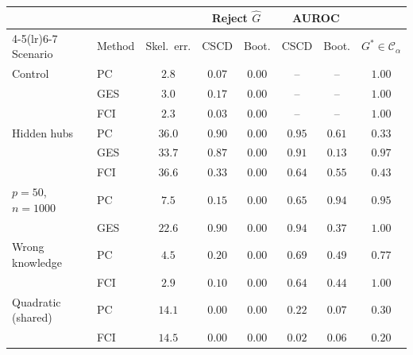 \begin{tabular}{llcccccc}
\toprule
 & & & \multicolumn{2}{c}{Reject $\widehat G$} & \multicolumn{2}{c}{AUROC} & \\ \cmidrule(lr){4-5}\cmidrule(lr){6-7}
Scenario & Method & Skel.\ err. & CSCD & Boot. & CSCD & Boot. & $G^\ast\in\mathcal{C}_\alpha$ \\
\midrule
Control & PC & $2.8$ & $0.07$ & $0.00$ & -- & -- & $1.00$ \\
 & GES & $3.0$ & $0.17$ & $0.00$ & -- & -- & $1.00$ \\
 & FCI & $2.3$ & $0.03$ & $0.00$ & -- & -- & $1.00$ \\
\addlinespace
Hidden hubs & PC & $36.0$ & $0.90$ & $0.00$ & $0.95$ & $0.61$ & $0.33$ \\
 & GES & $33.7$ & $0.87$ & $0.00$ & $0.91$ & $0.13$ & $0.97$ \\
 & FCI & $36.6$ & $0.33$ & $0.00$ & $0.64$ & $0.55$ & $0.43$ \\
\addlinespace
$p{=}50$, $n{=}1000$ & PC & $7.5$ & $0.15$ & $0.00$ & $0.65$ & $0.94$ & $0.95$ \\
 & GES & $22.6$ & $0.90$ & $0.00$ & $0.94$ & $0.37$ & $1.00$ \\
\addlinespace
Wrong knowledge & PC & $4.5$ & $0.20$ & $0.00$ & $0.69$ & $0.49$ & $0.77$ \\
 & FCI & $2.9$ & $0.10$ & $0.00$ & $0.64$ & $0.44$ & $1.00$ \\
\addlinespace
Quadratic (shared) & PC & $14.1$ & $0.00$ & $0.00$ & $0.22$ & $0.07$ & $0.30$ \\
 & FCI & $14.5$ & $0.00$ & $0.00$ & $0.02$ & $0.06$ & $0.20$ \\
\bottomrule
\end{tabular}
